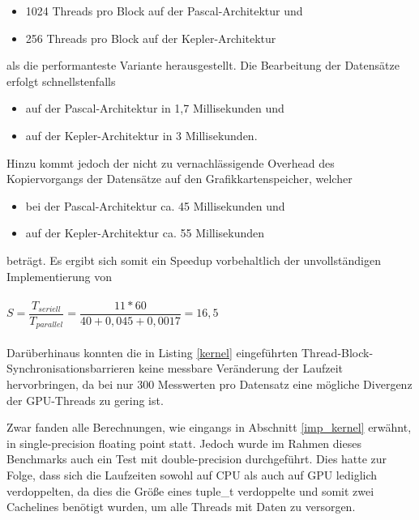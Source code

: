 \begin{itemize}
\item 1024 Threads pro Block auf der Pascal-Architektur und
\item 256 Threads pro Block auf der Kepler-Architektur
\end{itemize}
als die performanteste Variante herausgestellt. Die Bearbeitung der Datensätze erfolgt schnellstenfalls 
\begin{itemize}
\item auf der Pascal-Architektur in 1,7 Millisekunden und
\item auf der Kepler-Architektur in 3 Millisekunden.
\end{itemize}
Hinzu kommt jedoch der nicht zu vernachlässigende Overhead des Kopiervorgangs der Datensätze auf den Grafikkartenspeicher, welcher 
\begin{itemize}
\item bei der Pascal-Architektur ca. 45 Millisekunden und
\item auf der Kepler-Architektur ca. 55 Millisekunden
\end{itemize}
beträgt. Es ergibt sich somit ein Speedup vorbehaltlich der unvollständigen Implementierung von
\\\\
$S = \dfrac{T_{seriell}}{T_{parallel}} = \dfrac{11*60}{40+0,045+0,0017} = 16,5$
\\\\
Darüberhinaus konnten die in Listing \ref{kernel} eingeführten Thread-Block-Synchronisations\-barrieren keine messbare Veränderung der Laufzeit hervorbringen, da bei nur 300 Messwerten pro Datensatz eine mögliche Divergenz der GPU-Threads zu gering ist.

Zwar fanden alle Berechnungen, wie eingangs in Abschnitt \ref{imp_kernel} erwähnt, in single-precision floating point statt. Jedoch wurde im Rahmen dieses Benchmarks auch ein Test mit double-precision durchgeführt. Dies hatte zur Folge, dass sich die Laufzeiten sowohl auf CPU als auch auf GPU lediglich verdoppelten, da dies die Größe eines tuple\_t verdoppelte und somit zwei Cachelines benötigt wurden, um alle Threads mit Daten zu versorgen.


\pagebreak
